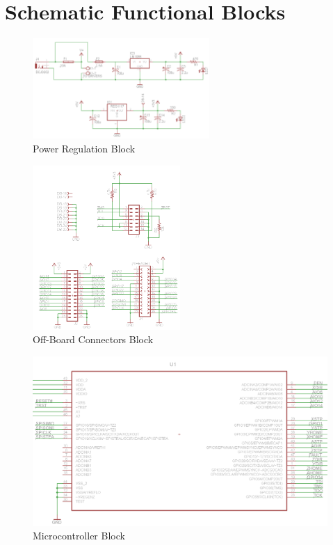 \chapter{Schematic Functional Blocks}
\label{chap:schematic-breakdown}

\begin{figure}[h]
\centering
\includegraphics[width=0.6\textwidth]{functional-breakdown-power.png}
\caption{Power Regulation Block}
\label{fig:power-block}
\end{figure}


\begin{figure}[h]
\centering
\includegraphics[width=0.5\textwidth]{functional-breakdown-connectors.png}
\caption{Off-Board Connectors Block}
\label{fig:connectors-block}
\end{figure}

\begin{figure}[h]
\centering
\includegraphics[width=\textwidth]{functional-breakdown-uc.png}
\caption{Microcontroller Block}
\label{fig:uc-block}
\end{figure}

